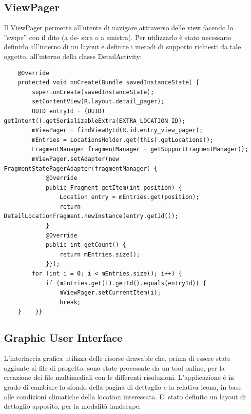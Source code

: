 \documentclass{article}
\begin{document}
\subsection{ViewPager}
Il ViewPager permette all’utente di navigare attraverso delle view facendo lo ”swipe” con il dito (a de-
stra o a sinistra). Per utilizzarlo è stato necessario definirlo all'interno di un layout
e definire i metodi di supporto richiesti da tale oggetto, all'interno della classe DetailActivity:
\begin{lstlisting}
    @Override
    protected void onCreate(Bundle savedInstanceState) {
        super.onCreate(savedInstanceState);
        setContentView(R.layout.detail_pager);
        UUID entryId = (UUID) getIntent().getSerializableExtra(EXTRA_LOCATION_ID);
        mViewPager = findViewById(R.id.entry_view_pager);
        mEntries = LocationsHolder.get(this).getLocations();
        FragmentManager fragmentManager = getSupportFragmentManager();
        mViewPager.setAdapter(new FragmentStatePagerAdapter(fragmentManager) {
            @Override
            public Fragment getItem(int position) {
                Location entry = mEntries.get(position);
                return DetailLocationFragment.newInstance(entry.getId());
            }
            @Override
            public int getCount() {
                return mEntries.size();
            }});
        for (int i = 0; i < mEntries.size(); i++) {
            if (mEntries.get(i).getId().equals(entryId)) {
                mViewPager.setCurrentItem(i);
                break;
    }    }}
\end{lstlisting}
\subsection{Graphic User Interface}
L'interfaccia grafica utilizza delle risorse drawable che, prima di essere state aggiunte ai file di progetto, sono state processate da un tool online, per la
creazione dei file multimediali con le differenti risoluzioni.
L'applicazione è in grado di cambiare lo sfondo della pagina di dettaglio e la relativa icona, in base alle condizioni climatiche della location interessata. E' stato definito un layout di dettaglio apposito, per la modalità landscape.
\end{document}
